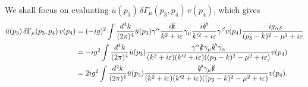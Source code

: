 \documentclass[11pt]{article}
\theoremstyle{definition}
\begin{document}
We shall focus on evaluating $\bar u(p_3)\,\delta\Gamma_\mu(p_3,p_4)\,v(p_4)$, which gives
\begin{equation}
    \begin{aligned}
        \bar u(p_3)\,\delta\Gamma_\mu(p_3,p_4)\,v(p_4) &= (-ig)^2\int \frac{d^4k}{(2\pi)^4}\bar{u}(p_3)\gamma^\alpha\frac{i\slashed{k}}{k^2 + i\varepsilon}\gamma_\mu\frac{i\slashed{k'}}{k'^2+i\varepsilon}\gamma^\beta v(p_4)\frac{-ig_{\alpha\beta}}{(p_3-k)^2-\mu^2+i\varepsilon}\\
        &= -ig^2\int \frac{d^4k}{(2\pi)^4}\bar{u}(p_3)\frac{\gamma^\alpha\slashed{k}\gamma_\mu\slashed{k'}\gamma_\alpha}{(k^2+i\varepsilon)(k'^2+i\varepsilon)((p_3-k)^2-\mu^2+i\varepsilon)}v(p_4)\\
        & = 2ig^2\int \frac{d^4k}{(2\pi)^4}\bar{u}(p_3)\frac{\slashed{k'}\gamma_\mu\slashed{k}}{(k^2+i\varepsilon)(k'^2+i\varepsilon)((p_3-k)^2-\mu^2+i\varepsilon)}v(p_4).
    \end{aligned}
\end{equation}
\end{document}
